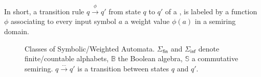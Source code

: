 
In short, a transition rule $q \xrightarrow{\phi} q'$ from state $q$ to $q'$ of a \SWA,
is labeled by a function $\phi$ associating to every input symbol $a$ a weight value $\phi(a)$
in a semiring domain.
%
\begin{figure}
\centering
{}
\caption{Classes of Symbolic/Weighted Automata.
$\Sigma_\mathsf{fin}$ and $\Sigma_\mathsf{inf}$ denote finite/countable alphabets,
$\mathbb{B}$  the Boolean algebra,
$\mathbb{S}$ a commutative semiring.
$q \xrightarrow{\dots} q'$ is a transition between states $q$ and $q'$.}
\label{fig:hierarchy}
\end{figure}
